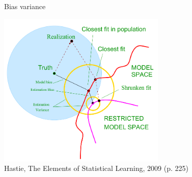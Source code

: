 \documentclass[11pt,compress,t,notes=noshow, xcolor=table]{beamer}
\begin{document}
\begin{vbframe}{Bias variance}
\framebreak

\center
\vspace*{0.5cm}
\includegraphics[width=0.6\textwidth]{figure_man/biasvariance_scheme.png} \\
\footnotesize{Hastie, The Elements of Statistical Learning, 2009 (p. 225)}


\end{vbframe}



\endlecture
\end{document}
